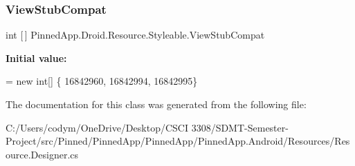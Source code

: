 \subsubsection{\texorpdfstring{View\+Stub\+Compat}{ViewStubCompat}}
{\footnotesize\ttfamily int \mbox{[}$\,$\mbox{]} Pinned\+App.\+Droid.\+Resource.\+Styleable.\+View\+Stub\+Compat\hspace{0.3cm}{\ttfamily [static]}}

{\bfseries Initial value\+:}
\begin{DoxyCode}
= \textcolor{keyword}{new} \textcolor{keywordtype}{int}[] \{
                    16842960,
                    16842994,
                    16842995\}
\end{DoxyCode}


The documentation for this class was generated from the following file\+:\begin{DoxyCompactItemize}
\item 
C\+:/\+Users/codym/\+One\+Drive/\+Desktop/\+C\+S\+C\+I 3308/\+S\+D\+M\+T-\/\+Semester-\/\+Project/src/\+Pinned/\+Pinned\+App/\+Pinned\+App/\+Pinned\+App.\+Android/\+Resources/Resource.\+Designer.\+cs\end{DoxyCompactItemize}
